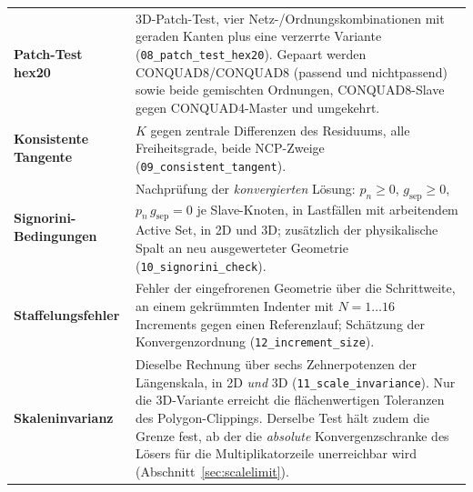 \documentclass[a4paper,11pt]{article}
\def\bm#1{#1}%
\newcommand{\file}[1]{\texttt{\small #1}}
\begin{document}
\begin{center}
\begin{tabularx}{\linewidth}{lX}
\textbf{Patch-Test hex20} & 3D-Patch-Test, vier Netz-/Ordnungskombinationen mit geraden Kanten plus eine verzerrte Variante (\file{08\_patch\_test\_hex20}). Gepaart werden CONQUAD8/CONQUAD8 (passend und nichtpassend) sowie beide gemischten Ordnungen, CONQUAD8-Slave gegen CONQUAD4-Master und umgekehrt. \\
\textbf{Konsistente Tangente} & $\bm K$ gegen zentrale Differenzen des Residuums, alle Freiheitsgrade, beide NCP-Zweige (\file{09\_consistent\_tangent}). \\
\textbf{Signorini-Bedingungen} & Nachprüfung der \emph{konvergierten} Lösung: $p_n\ge0$, $g_{\text{sep}}\ge0$, $p_n\,g_{\text{sep}}=0$ je Slave-Knoten, in Lastfällen mit arbeitendem Active Set, in 2D und 3D; zusätzlich der physikalische Spalt an neu ausgewerteter Geometrie (\file{10\_signorini\_check}). \\
\textbf{Staffelungsfehler} & Fehler der eingefrorenen Geometrie über die Schrittweite, an einem gekrümmten Indenter mit $N=1\ldots16$ Increments gegen einen Referenzlauf; Schätzung der Konvergenzordnung (\file{12\_increment\_size}). \\
\textbf{Skaleninvarianz} & Dieselbe Rechnung über sechs Zehnerpotenzen der Längenskala, in 2D \emph{und} 3D (\file{11\_scale\_invariance}). Nur die 3D-Variante erreicht die flächenwertigen Toleranzen des Polygon-Clippings. Derselbe Test hält zudem die Grenze fest, ab der die \emph{absolute} Konvergenzschranke des Lösers für die Multiplikatorzeile unerreichbar wird (Abschnitt~\ref{sec:scalelimit}). \\
\bottomrule
\end{tabularx}
\end{center}
\end{document}
